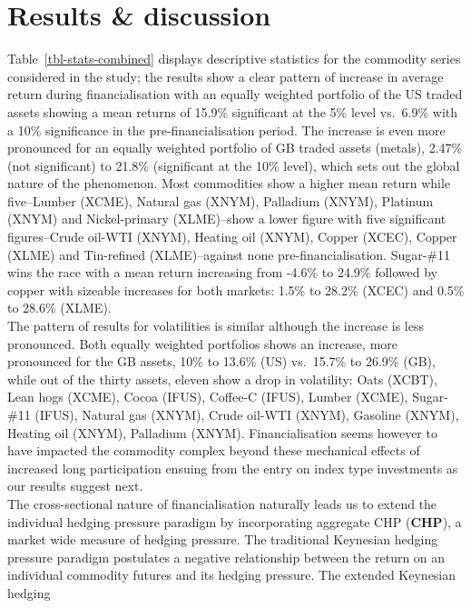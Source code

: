 \documentclass[
  authoryear,
  preprint,
  3p]{elsarticle}
\begin{document}
\newpage

\section{Results \& discussion}\label{sec-results}

Table~\ref{tbl-stats-combined} displays descriptive statistics for the
commodity series considered in the study; the results show a clear
pattern of increase in average return during financialisation with an
equally weighted portfolio of the US traded assets showing a mean
returns of 15.9\% significant at the 5\% level vs.~6.9\% with a 10\%
significance in the pre-financialisation period. The increase is even
more pronounced for an equally weighted portfolio of GB traded assets
(metals), 2.47\% (not significant) to 21.8\% (significant at the 10\%
level), which sets out the global nature of the phenomenon. Most
commodities show a higher mean return while five--Lumber (XCME), Natural
gas (XNYM), Palladium (XNYM), Platinum (XNYM) and Nickel-primary
(XLME)--show a lower figure with five significant figures--Crude oil-WTI
(XNYM), Heating oil (XNYM), Copper (XCEC), Copper (XLME) and Tin-refined
(XLME)--against none pre-financialisation. Sugar-\#11 wins the race with
a mean return increasing from -4.6\% to 24.9\% followed by copper with
sizeable increases for both markets: 1.5\% to 28.2\% (XCEC) and 0.5\% to
28.6\% (XLME).\\
The pattern of results for volatilities is similar although the increase
is less pronounced. Both equally weighted portfolios shows an increase,
more pronounced for the GB assets, 10\% to 13.6\% (US) vs.~15.7\% to
26.9\% (GB), while out of the thirty assets, eleven show a drop in
volatility: Oats (XCBT), Lean hogs (XCME), Cocoa (IFUS), Coffee-C
(IFUS), Lumber (XCME), Sugar-\#11 (IFUS), Natural gas (XNYM), Crude
oil-WTI (XNYM), Gasoline (XNYM), Heating oil (XNYM), Palladium (XNYM).
Financialisation seems however to have impacted the commodity complex
beyond these mechanical effects of increased long participation ensuing
from the entry on index type investments as our results suggest next.\\
The cross-sectional nature of financialisation naturally leads us to
extend the individual hedging pressure paradigm by incorporating
aggregate CHP (\textbf{CHP}), a market wide measure of hedging pressure.
The traditional Keynesian hedging pressure paradigm postulates a
negative relationship between the return on an individual commodity
futures and its hedging pressure. The extended Keynesian hedging
\end{document}
